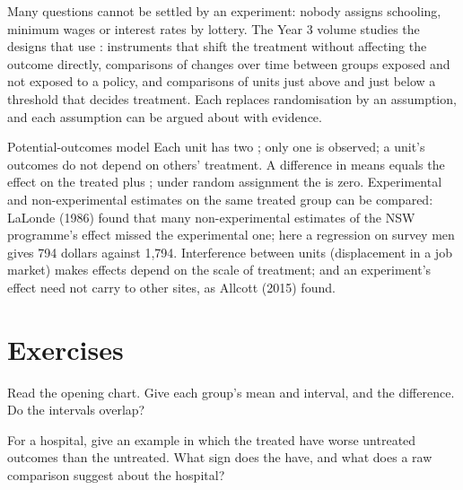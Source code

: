 Many questions cannot be settled by an experiment: nobody assigns schooling, minimum wages or interest rates by lottery.
The Year 3 volume studies the designs that use : instruments that shift the treatment without
affecting the outcome directly, comparisons of changes over time between groups exposed and not exposed to a policy, and
comparisons of units just above and just below a threshold that decides treatment. Each replaces randomisation by an
assumption, and each assumption can be argued about with evidence.

\begin{model}{Potential-outcomes model}
\assumes Each unit has two ; only one is observed; a unit's outcomes do not depend on others'
treatment.
\predicts A difference in means equals the effect on the treated plus ; under random assignment the
 is zero.
\tested Experimental and non-experimental estimates on the same treated group can be compared: LaLonde (1986) found that
many non-experimental estimates of the NSW programme's effect missed the experimental one; here a regression on survey
men gives 794 dollars against 1,794.
\breaks Interference between units (displacement in a job market) makes effects depend on the scale of treatment; and an
experiment's effect need not carry to other sites, as Allcott (2015) found.
\end{model}

\section{Exercises}\label{sec:b2:causality-and-experiments:exercises}

\begin{exercise}[$\star$]\label{exo:b2:causality-and-experiments:1}
Read the opening chart. Give each group's mean and interval, and the difference. Do the intervals overlap?
\end{exercise}

\begin{exercise}[$\star$]\label{exo:b2:causality-and-experiments:2}
For a hospital, give an example in which the treated have worse untreated outcomes than the untreated. What sign does the
 have, and what does a raw comparison suggest about the hospital?
\end{exercise}


